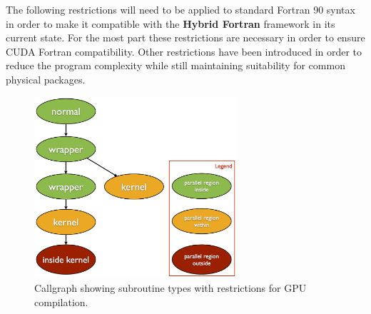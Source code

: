 The following restrictions will need to be applied to standard Fortran 90 syntax in order to make it compatible with the \textbf{Hybrid Fortran} framework in its current state. For the most part these restrictions are necessary in order to ensure CUDA Fortran compatibility. Other restrictions have been introduced in order to reduce the program complexity while still maintaining suitability for common physical packages.

\begin{figure}[htpb]
	\centering
	\includegraphics[width=7.5cm]{figures/subroutineTypes.png}
	\caption[Hybrid Fortran Subroutine Types]{Callgraph showing subroutine types with restrictions for GPU compilation.}
	\label{figure:subroutineTypes}
\end{figure}

